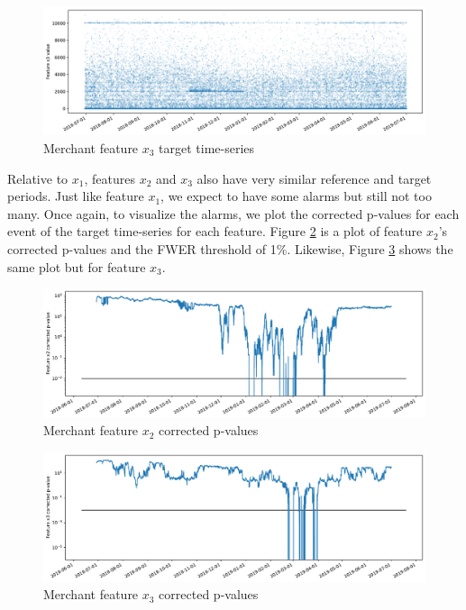 \begin{figure}[!htb]
    \begin{center}
      \includegraphics[scale=0.5]{figures/merchant-x3-target.pdf}
      \caption{Merchant feature $x_3$ target time-series}
      \label{fig:merchant-x3-target}
    \end{center}
\end{figure}
\clearpage
Relative to $x_1$, features $x_2$ and $x_3$ also have very similar reference and target periods. Just like feature $x_1$, we expect to have some alarms but still not too many. Once again, to visualize the alarms, we plot the corrected p-values for each event of the target time-series for each feature. Figure \ref{fig:merchant-x2-correctedpvalues} is a plot of feature $x_2$'s corrected p-values and the FWER threshold of 1\%. Likewise, Figure \ref{fig:merchant-x3-correctedpvalues} shows the same plot but for feature $x_3$.
\begin{figure}[!htb]
    \begin{center}
      \includegraphics[scale=0.5]{figures/merchant-x2-correctedpvalues.pdf}
      \caption{Merchant feature $x_2$ corrected p-values}
      \label{fig:merchant-x2-correctedpvalues}
    \end{center}
\end{figure}
\begin{figure}[!htb]
    \begin{center}
      \includegraphics[scale=0.5]{figures/merchant-x3-correctedpvalues.pdf}
      \caption{Merchant feature $x_3$ corrected p-values}
      \label{fig:merchant-x3-correctedpvalues}
    \end{center}
\end{figure}
